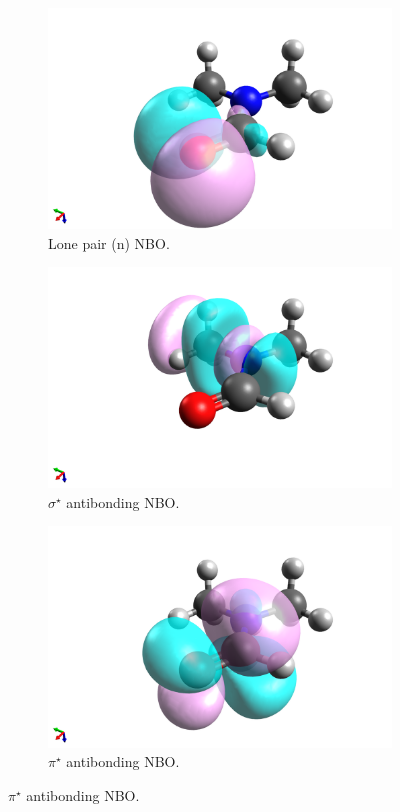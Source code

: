 \begin{refsection}
\begin{figure}
    \begin{subfigure}{0.3\linewidth}
        \includegraphics[width=\linewidth]{Figures/dmfnbo-n.png}
        \caption{Lone pair (n) NBO.}
    \end{subfigure}
    \begin{subfigure}{0.3\linewidth}
        \includegraphics[width=\linewidth]{Figures/dmfnbo-sigmastar.png}
        \caption{$\sigma^{\star}$ antibonding NBO.}
    \end{subfigure}
    \begin{subfigure}{0.3\linewidth}
        \includegraphics[width=\linewidth]{Figures/dmfnbo-pistar.png}
        \caption{$\pi^{\star}$ antibonding NBO.}
    \end{subfigure}


\end{figure}
\end{refsection}
